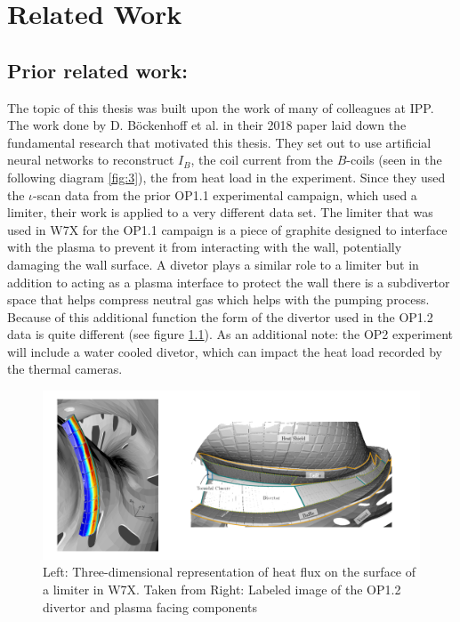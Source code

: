 %
\chapter{Related Work}
\label{sec:related}

\section{Prior related work: }

The topic of this thesis was built upon the work of many of colleagues at IPP. The work done by D. Böckenhoff et al. in their 2018 paper \cite{Böckenhoff_2018} laid down the fundamental research that motivated this thesis. They set out to use artificial neural networks to reconstruct $I_B$, the coil current from the $B$-coils (seen in the following diagram \ref{fig:3}), the from heat load in the experiment. Since they used the $\iota$-scan data from the prior OP1.1 experimental campaign, which used a limiter, their work is applied to a very different data set. The limiter that was used in W7X for the OP1.1 campaign is a piece of graphite designed to interface with the plasma to prevent it from interacting with the wall, potentially damaging the wall surface. A divetor plays a similar role to a limiter but in addition to acting as a plasma interface to protect the wall there is a subdivertor space that helps compress neutral gas which helps with the pumping process. Because of this additional function the form of the divertor used in the OP1.2 data is quite different (see figure \ref{fig:limiter-divertor}). As an additional note: the OP2 experiment will include a water cooled divetor, which can impact the heat load recorded by the thermal cameras.

\begin{figure}[!htb]
    \centering
    \includegraphics[width = \textwidth]{images/limiter-divetor.png}
    \caption{Left: Three-dimensional representation of heat flux on the surface of a limiter in W7X. Taken from \cite{Böckenhoff_2018} Right: Labeled image of the OP1.2 divertor and plasma facing components} \label{fig:limiter-divertor}
\end{figure}

